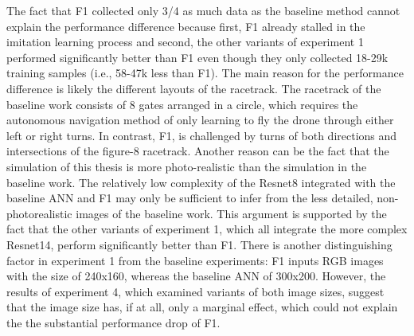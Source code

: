 The fact that F1 collected only 3/4 as much data as the baseline method
cannot explain the performance difference
because first,
F1 already stalled in the imitation learning process
and second, the other variants of experiment 1 
performed significantly better than F1 
even though they only collected 18-29k training samples  (i.e., 58-47k less than F1).
The main reason for the performance difference 
is likely the different layouts of the racetrack.
The racetrack of the baseline work consists of 8 gates arranged in a circle,
which requires the autonomous navigation method of only learning to fly the drone 
through either left or right turns.
In contrast, F1, is challenged by turns of both directions and intersections of the figure-8 racetrack.
Another reason can be the fact that the
simulation of this thesis is more photo-realistic than the simulation in the baseline work.
The relatively low complexity of the Resnet8 integrated with the baseline ANN and F1 
may only be sufficient to infer from the less detailed, non-photorealistic images of the baseline work.
This argument is supported by the fact that 
the other variants of experiment 1, which all integrate the more complex Resnet14,
perform significantly better than F1.
There is another distinguishing factor in experiment 1 from the baseline experiments:
F1 inputs RGB images with the size of 240x160, whereas the baseline ANN of 300x200.
However, the results of experiment 4, which examined variants of both image sizes, 
suggest that the image size has, if at all, only a marginal effect,
which could not explain the the substantial performance drop of F1.

